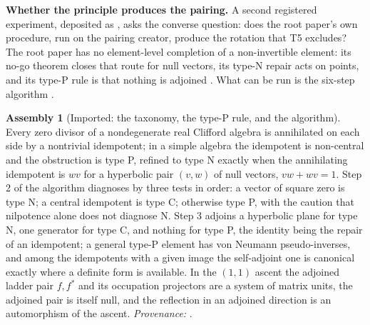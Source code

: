 \documentclass[11pt]{article}
\theoremstyle{definition}
\newtheorem{assembled}[theorem]{Assembly}
\theoremstyle{plain}
\begin{document}
\label{c:note.descent-lift.setting-what-does-two-papers-what-2}
\textbf{Whether the principle produces the pairing.} A second registered experiment, deposited as \cite{ButlerPreregT05pairing}, asks the converse question: does the root paper's own procedure, run on the pairing creator, produce the rotation that T5 excludes? The root paper has no element-level completion of a non-invertible element: its no-go theorem closes that route for null vectors, its type-N repair acts on points, and its type-P rule is that nothing is adjoined \cite[Thm.~4.2, Prop.~6.1]{ButlerT1}. What can be run is the six-step algorithm \cite[Table~1]{ButlerT1}.

\begin{assembled}[Imported: the taxonomy, the type-P rule, and the algorithm]\label{c:descent-lift.imported-taxonomy-type-p-rule-algorithm}
Every zero divisor of a nondegenerate real Clifford algebra is annihilated on each side by a nontrivial idempotent; in a simple algebra the idempotent is non-central and the obstruction is type P, refined to type N exactly when the annihilating idempotent is $wv$ for a hyperbolic pair $(v, w)$ of null vectors, $vw + wv = 1$. Step 2 of the algorithm diagnoses by three tests in order: a vector of square zero is type N; a central idempotent is type C; otherwise type P, with the caution that nilpotence alone does not diagnose N. Step 3 adjoins a hyperbolic plane for type N, one generator for type C, and nothing for type P, the identity being the repair of an idempotent; a general type-P element has von Neumann pseudo-inverses, and among the idempotents with a given image the self-adjoint one is canonical exactly where a definite form is available. In the $(1,1)$ ascent the adjoined ladder pair $f, f^{*}$ and its occupation projectors are a system of matrix units, the adjoined pair is itself null, and the reflection in an adjoined direction is an automorphism of the ascent. \emph{Provenance:} \cite[Def.~3.1, Ex.~3.5, Thm.~3.9, Thm.~4.2, Rem.~5.8, Prop.~6.1, Rem.~6.6, Thm.~7.1, Prop.~7.8, Table~1]{ButlerT1}.
\end{assembled}
\end{document}
